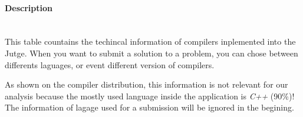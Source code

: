 \begin{figure}
  \vspace{-20pt}
  \begin{center}
  \end{center}
  \vspace{-20pt}
\end{figure}
\paragraph{Description}~\\ %
This table countains the techincal information of compilers inplemented into the Jutge. When you want to submit a solution to a problem, you can chose between differents laguages, or event different version of compilers. 

As shown on  the compiler distribution, this information is not relevant for our analysis because the mostly used language inside the application is \emph{C++} (90\%)! The  information of lagage used for a submission will be ignored in the begining.

